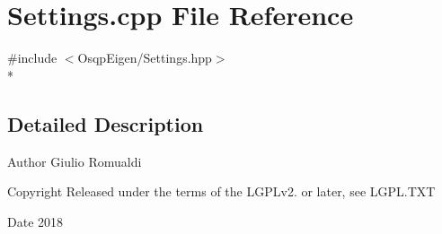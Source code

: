 \section{Settings.\+cpp File Reference}
\label{Settings_8cpp}
{\ttfamily \#include $<$Osqp\+Eigen/\+Settings.\+hpp$>$}\\*


\subsection{Detailed Description}
\begin{DoxyAuthor}{Author}
Giulio Romualdi 
\end{DoxyAuthor}
\begin{DoxyCopyright}{Copyright}
Released under the terms of the L\+G\+P\+Lv2. or later, see L\+G\+P\+L.\+T\+XT 
\end{DoxyCopyright}
\begin{DoxyDate}{Date}
2018 
\end{DoxyDate}
